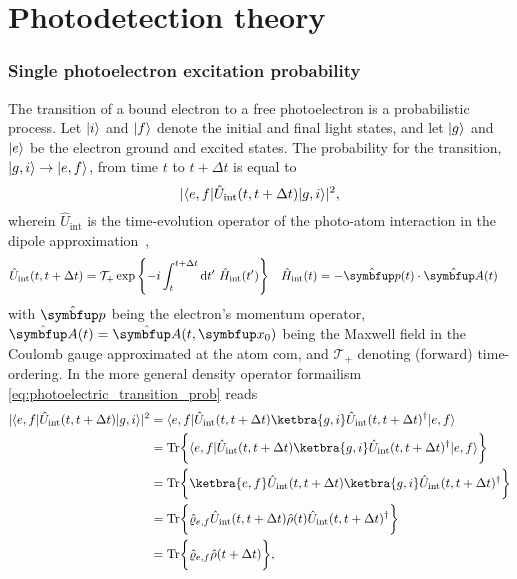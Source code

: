\chapter{Photodetection theory}

\subsection{Single photoelectron excitation probability}

The transition of a bound electron to a free photoelectron is a probabilistic process.
Let $\lvert i\rangle$ and $\lvert f\rangle$ denote the initial and final light states, and let $\lvert g\rangle$ and $\lvert e\rangle$ be the electron ground and excited states.
The probability for the transition, $\lvert g,i\rangle\to\lvert e,f\rangle$, from time $t$ to $t+\Delta t$ is equal to
\begin{equation}
	\lvert
		\langle e,f\rvert
		\hat{U}_\text{int}(t,t+\Delta t)
		\lvert g,i\rangle
	\rvert^2
	\label{eq:photoelectric_transition_prob}
	,
\end{equation}
wherein $\hat{U}_\text{int}$ is the time-evolution operator of the photo-atom interaction in the dipole approximation~\cite[p.~689]{Mandel1995},
\begin{align}
	\hat{U}_\text{int}(t,t+\Delta t)
	&=
	\mathcal{T}_+
	\exp\left\{
		-i
		\int_t^{t+\Delta t}
		\dd{t^\prime}
		\hat{H}_\text{int}(t^\prime)
	\right\}
	&
	\hat{H}_\text{int}(t)
	&=
	-
	\hat{\vb{p}}(t)
	\vdot
	\hat{\vb{A}}(t)
	\label{eq:photoelectric_time_evolution_operator}
\end{align}
with $\vu{p}$ being the electron's momentum operator, $\vu{A}(t)=\vu{A}(t,\vb{x}_0)$ being the Maxwell field in the Coulomb gauge approximated at the atom \gls{com}, and $\mathcal{T}_+$ denoting (forward) time-ordering.
In the more general density operator formailism \cref{eq:photoelectric_transition_prob} reads~\cite[p.~686]{Mandel1995}
\begin{equation}
	\begin{split}
		\abs{
			\bra{e,f}
			\hat{U}_\text{int}(t,t+\Delta t)
			\ket{g,i}
		}^2
		&=
		\bra{e,f}
		\hat{U}_\text{int}(t,t+\Delta t)
		\ketbra{g,i}
		\hat{U}_\text{int}(t,t+\Delta t)^\dagger
		\ket{e,f}
		\\
		&=
		\trace\biggl\{
			\bra{e,f}
			\hat{U}_\text{int}(t,t+\Delta t)
			\ketbra{g,i}
			\hat{U}_\text{int}(t,t+\Delta t)^\dagger
			\ket{e,f}
		\biggr\}
		\\
		&=
		\trace\biggl\{
			\ketbra{e,f}
			\hat{U}_\text{int}(t,t+\Delta t)
			\ketbra{g,i}
			\hat{U}_\text{int}(t,t+\Delta t)^\dagger
		\biggr\}
		\\
		&=
		\trace\biggl\{
			\hat\varrho_{e,f}
			\hat{U}_\text{int}(t,t+\Delta t)
			\hat\rho(t)
			\hat{U}_\text{int}(t,t+\Delta t)^\dagger
		\biggr\}
		\\
		&=
		\trace\biggl\{
			\hat\varrho_{e,f}
			\hat\rho(t+\Delta t)
		\biggr\}
		,
	\end{split}
	\label{eq:photoelectric_transition_prob_density}
\end{equation}
